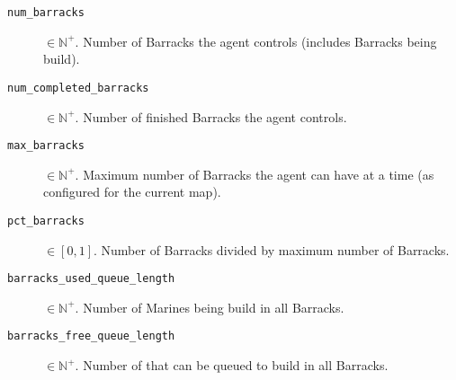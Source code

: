 \begin{description}
    \item[\texttt{num\_barracks}] $\in \mathbb{N}^+$. Number of Barracks the agent controls (includes Barracks being build).
    \item[\texttt{num\_completed\_barracks}] $\in \mathbb{N}^+$. Number of finished Barracks the agent controls.
    \item[\texttt{max\_barracks}] $\in \mathbb{N}^+$. Maximum number of Barracks the agent can have at a time (as configured for the current map).
    \item[\texttt{pct\_barracks}] $\in [0,1]$. Number of Barracks divided by maximum number of Barracks.
    \item[\texttt{barracks\_used\_queue\_length}] $\in \mathbb{N}^+$. Number of Marines being build in all Barracks.
    \item[\texttt{barracks\_free\_queue\_length}] $\in \mathbb{N}^+$. Number of that can be queued to build in all Barracks.
\end{description}

